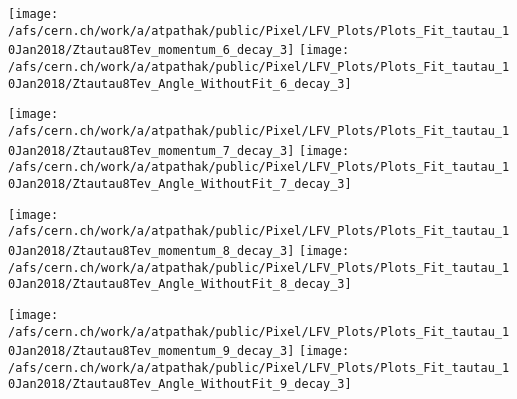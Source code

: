 \documentclass{beamer}
\begin{document}
\begin{frame}
\begin{normalsize}
\begin{center}
\texttt{[image: /afs/cern.ch/work/a/atpathak/public/Pixel/LFV\_Plots/Plots\_Fit\_tautau\_10Jan2018/Ztautau8Tev\_momentum\_6\_decay\_3]}
\texttt{[image: /afs/cern.ch/work/a/atpathak/public/Pixel/LFV\_Plots/Plots\_Fit\_tautau\_10Jan2018/Ztautau8Tev\_Angle\_WithoutFit\_6\_decay\_3]} 
\end{center}
\end{normalsize}
\end {frame}
\begin{frame}
\begin{normalsize}
\begin{center}
\texttt{[image: /afs/cern.ch/work/a/atpathak/public/Pixel/LFV\_Plots/Plots\_Fit\_tautau\_10Jan2018/Ztautau8Tev\_momentum\_7\_decay\_3]}
\texttt{[image: /afs/cern.ch/work/a/atpathak/public/Pixel/LFV\_Plots/Plots\_Fit\_tautau\_10Jan2018/Ztautau8Tev\_Angle\_WithoutFit\_7\_decay\_3]} 
\end{center}
\end{normalsize}
\end {frame}
\begin{frame}
\begin{normalsize}
\begin{center}
\texttt{[image: /afs/cern.ch/work/a/atpathak/public/Pixel/LFV\_Plots/Plots\_Fit\_tautau\_10Jan2018/Ztautau8Tev\_momentum\_8\_decay\_3]}
\texttt{[image: /afs/cern.ch/work/a/atpathak/public/Pixel/LFV\_Plots/Plots\_Fit\_tautau\_10Jan2018/Ztautau8Tev\_Angle\_WithoutFit\_8\_decay\_3]} 
\end{center}
\end{normalsize}
\end {frame}
\begin{frame}
\begin{normalsize}
\begin{center}
\texttt{[image: /afs/cern.ch/work/a/atpathak/public/Pixel/LFV\_Plots/Plots\_Fit\_tautau\_10Jan2018/Ztautau8Tev\_momentum\_9\_decay\_3]}
\texttt{[image: /afs/cern.ch/work/a/atpathak/public/Pixel/LFV\_Plots/Plots\_Fit\_tautau\_10Jan2018/Ztautau8Tev\_Angle\_WithoutFit\_9\_decay\_3]} 
\end{center}
\end{normalsize}
\end {frame}
\end{document}
